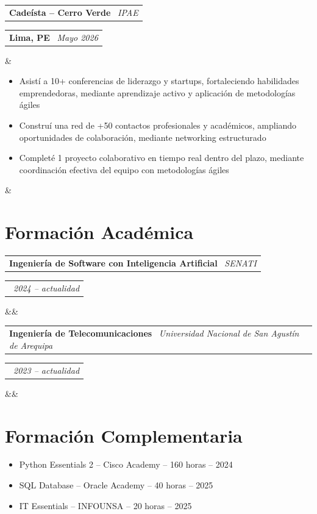 \documentclass[11pt,a4paper,sans]{moderncv}
\makeatletter
\newcommand*{\customcventry}[7][.13em]{
\begin{tabular}{@{}l}
{\bfseries #4} \
{\itshape #3}
\end{tabular}
\hfill
\begin{tabular}{l@{}}
{\bfseries #5} \
{\itshape #2}
\end{tabular}
\ifx&#7&%
\else{\
\begin{minipage}{\maincolumnwidth}%
\small#7%
\end{minipage}}\fi%
\par\addvspace{#1}}
\makeatother
\begin{document}
\customcventry{Mayo 2026}{{{IPAE}}}{Cadeísta – Cerro Verde}{Lima, PE}{}{
{\begin{itemize}[leftmargin=0.6cm, label={\textbullet}]
\item Asistí a 10+ conferencias de liderazgo y startups, fortaleciendo habilidades emprendedoras, mediante aprendizaje activo y aplicación de metodologías ágiles
\item Construí una red de +50 contactos profesionales y académicos, ampliando oportunidades de colaboración, mediante networking estructurado
\item Completé 1 proyecto colaborativo en tiempo real dentro del plazo, mediante coordinación efectiva del equipo con metodologías ágiles
\end{itemize}}}

\section{Formación Académica}
\customcventry{2024 – actualidad}{SENATI}{Ingeniería de Software con Inteligencia Artificial}{}{}{}

\vspace{0.5cm}
\customcventry{2023 – actualidad}{Universidad Nacional de San Agustín de Arequipa}{Ingeniería de Telecomunicaciones}{}{}{}


\section{Formación Complementaria}
{\begin{itemize}[label=\textbullet]
      \item Python Essentials 2 – Cisco Academy – 160 horas – 2024
      \item SQL Database – Oracle Academy – 40 horas – 2025
      \item IT Essentials – INFOUNSA – 20 horas – 2025
  \end{itemize}} 


\end{document}
